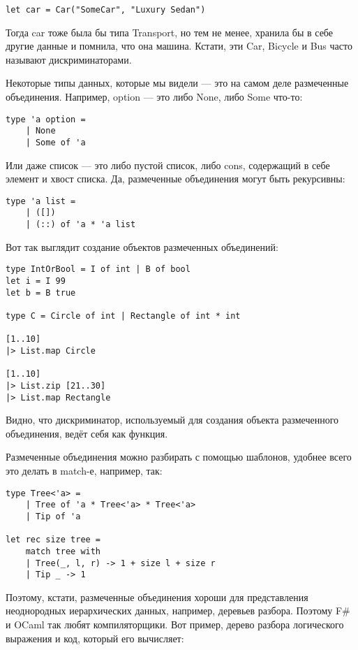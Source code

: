\documentclass{../../text-style}
\begin{document}
\begin{verbatim}
let car = Car("SomeCar", "Luxury Sedan")
\end{verbatim}

Тогда car тоже была бы типа Transport, но тем не менее, хранила бы в себе другие данные и помнила, что она машина. Кстати, эти Car, Bicycle и Bus часто называют дискриминаторами.

Некоторые типы данных, которые мы видели --- это на самом деле размеченные объединения. Например, option --- это либо None, либо Some что-то:

\begin{verbatim}
type 'a option =
    | None
    | Some of 'a
\end{verbatim}

Или даже список --- это либо пустой список, либо cons, содержащий в себе элемент и хвост списка. Да, размеченные объединения могут быть рекурсивны:

\begin{verbatim}
type 'a list =
    | ([])
    | (::) of 'a * 'a list
\end{verbatim}

Вот так выглядит создание объектов размеченных объединений:

\begin{verbatim}
type IntOrBool = I of int | B of bool
let i = I 99
let b = B true

type C = Circle of int | Rectangle of int * int

[1..10]
|> List.map Circle

[1..10]
|> List.zip [21..30]
|> List.map Rectangle
\end{verbatim}

Видно, что дискриминатор, используемый для создания объекта размеченного объединения, ведёт себя как функция.

Размеченные объединения можно разбирать с помощью шаблонов, удобнее всего это делать в match-е, например, так:

\begin{verbatim}
type Tree<'a> =
    | Tree of 'a * Tree<'a> * Tree<'a>
    | Tip of 'a

let rec size tree =
    match tree with
    | Tree(_, l, r) -> 1 + size l + size r
    | Tip _ -> 1
\end{verbatim}

Поэтому, кстати, размеченные объединения хороши для представления неоднородных иерархических данных, например, деревьев разбора. Поэтому F\# и OCaml так любят компиляторщики. Вот пример, дерево разбора логического выражения и код, который его вычисляет:
\end{document}

